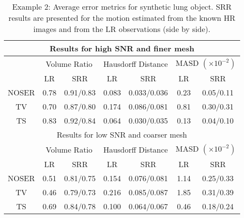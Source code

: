 \documentclass[10pt]{IEEEtran}
\begin{document}
\renewcommand{\arraystretch}{1.3}
\begin{table}
    \footnotesize
    \centering
    \begin{tabular}{|c|c|c|c|c|c|c|}
    \hline
    \multicolumn{7}{|c|}{Results for high SNR and finer mesh} \\ \hline
    &\multicolumn{2}{|c|}{Volume Ratio}& \multicolumn{2}{|c|}{Hausdorff Distance} & \multicolumn{2}{|c|}{MASD $(\times10^{-2})$} \\ \hline
       & LR & SRR & LR & SRR & LR & SRR \\ \hline
    NOSER & 0.78 & 0.91/0.83 & 0.083 & 0.033/0.036 & 0.23 & 0.05/0.11 \\ \hline
    TV    & 0.70 & 0.87/0.80 & 0.174 & 0.086/0.081 & 0.81 & 0.30/0.31 \\ \hline
    TS    & 0.83 & 0.92/0.84 & 0.064 & 0.030/0.035 & 0.13 & 0.04/0.10 \\ \hline
    \multicolumn{7}{|c|}{Results for low SNR and coarser mesh} \\ \hline
    &\multicolumn{2}{|c|}{Volume Ratio}& \multicolumn{2}{|c|}{Hausdorff Distance} & \multicolumn{2}{|c|}{MASD $(\times10^{-2})$} \\ \hline
       & LR & SRR & LR & SRR & LR & SRR \\ \hline
    NOSER & 0.51 & 0.81/0.75 & 0.154 & 0.076/0.081 & 1.14 & 0.25/0.33 \\ \hline
    TV    & 0.46 & 0.79/0.73 & 0.216 & 0.085/0.087 & 1.85 & 0.31/0.39 \\ \hline
    TS    & 0.69 & 0.84/0.78 & 0.100 & 0.064/0.067 & 0.46 & 0.18/0.24 \\ \hline
    \end{tabular}
    \vspace{0.25cm}
    \caption{Example 2: Average error metrics for synthetic lung object. SRR results are presented for the motion estimated from the known HR images and from the LR observations (side by side).}
    \label{ref:tab_ex2_quant}
\end{table}








\end{document}
